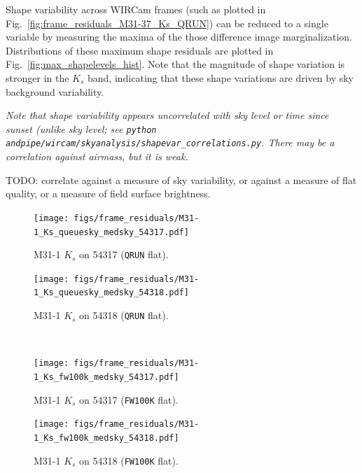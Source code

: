 \documentclass[iop]{emulateapj}
\newcommand{\todo}[1]{\textcolor{BurntOrange}{\textsf{#1}}} %
\newcommand{\comment}[1]{\textcolor{OliveGreen}{\textit{#1}}} %
\newcommand{\Fig}[1]{Fig.~\ref{fig:#1}}  %
\begin{document}
Shape variability across WIRCam frames (such as plotted in \Fig{frame_residuals_M31-37_Ks_QRUN}) can be reduced to a single variable by measuring the maxima of the those difference image marginalization.
Distributions of these maximum shape residuals are plotted in \Fig{max_shapelevels_hist}.
Note that the magnitude of shape variation is stronger in the $K_s$ band, indicating that these shape variations are driven by sky background variability.

\comment{Note that shape variability appears uncorrelated with sky level or time since sunset (unlike sky level; see \texttt{python andpipe/wircam/skyanalysis/shapevar\_correlations.py}.
There may be a correlation against airmass, but it is weak.}

\todo{TODO: correlate against a measure of sky variability, or against a measure of flat quality, or a measure of field surface brightness}.

\begin{figure}[p]
\begin{minipage}[b]{0.46\linewidth}
  \centering
\texttt{[image: figs/frame\_residuals/M31-1\_Ks\_queuesky\_medsky\_54317.pdf]}
\caption{M31-1 $K_s$ on 54317 (\texttt{QRUN} flat).}
\label{fig:m311Ks_frameresiduals_54317_qrun}
\end{minipage}
\begin{minipage}[b]{0.46\linewidth}
  \centering
\texttt{[image: figs/frame\_residuals/M31-1\_Ks\_queuesky\_medsky\_54318.pdf]}
\caption{M31-1 $K_s$ on 54318 (\texttt{QRUN} flat).}
\label{fig:m311Ks_frameresiduals_54318_qrun}
\end{minipage} \\
\begin{minipage}[b]{0.46\linewidth}
\texttt{[image: figs/frame\_residuals/M31-1\_Ks\_fw100k\_medsky\_54317.pdf]}
\caption{M31-1 $K_s$ on 54317 (\texttt{FW100K} flat).}
\label{fig:m311Ks_frameresiduals_54317_fw100k}
\end{minipage}
%
\begin{minipage}[b]{0.46\linewidth}
\texttt{[image: figs/frame\_residuals/M31-1\_Ks\_fw100k\_medsky\_54318.pdf]}
\caption{M31-1 $K_s$ on 54318 (\texttt{FW100K} flat).}
\label{fig:m311Ks_frameresiduals_54318_fw100k}
\end{minipage}



\end{figure}
\end{document}
